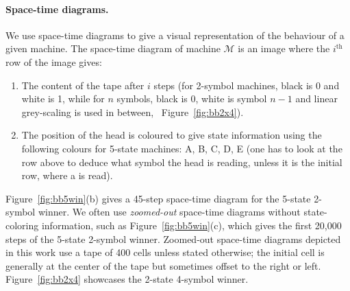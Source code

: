 \paragraph*{Space-time diagrams.} We use space-time diagrams to give a visual representation of the behaviour of a given machine. The space-time diagram of machine $\mathcal{M}$ is an image where the $i^\text{th}$ row of the image gives:
\begin{enumerate}
    \item The content of the tape after $i$ steps (for 2-symbol machines, black is 0 and white is 1, while for $n$ symbols, black is 0, white is symbol $n-1$ and linear grey-scaling is used in between, \eg~Figure~\ref{fig:bb2x4}).
    \item The position of the head is coloured to give state information using the following colours for 5-state machines: \textcolor{colorA}{A},  \textcolor{colorB}{B},  \textcolor{colorC}{C},  \textcolor{colorD}{D},  \textcolor{colorE}{E} (one has to look at the row above to deduce what symbol the head is reading, unless it is the initial row, where a \szero is read).
\end{enumerate}

Figure~\ref{fig:bb5win}(b) gives a 45-step space-time diagram for the 5-state 2-symbol \BBfull winner. We often use \textit{zoomed-out} space-time diagrams without state-coloring information, such as Figure~\ref{fig:bb5win}(c), which gives the first 20,000 steps of the 5-state 2-symbol \BBfull winner. Zoomed-out space-time diagrams depicted in this work use a tape of 400 cells unless stated otherwise; the initial cell is generally at the center of the tape but sometimes offset to the right or left. Figure~\ref{fig:bb2x4} showcases the 2-state 4-symbol \BBfull winner.


